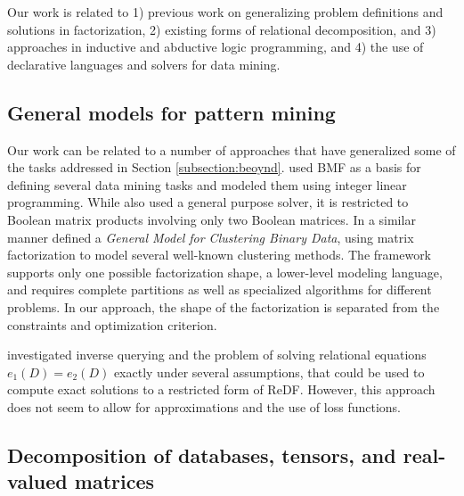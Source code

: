\label{sec:relwork}
Our work is related to 1) previous work on generalizing problem definitions and solutions in factorization, 2) existing forms of relational decomposition, and 3) approaches in inductive and abductive logic programming, and 4) the use of declarative languages and solvers for data mining.



\subsection{General models for pattern mining} 
Our work can be related to a number of approaches that have generalized some of the tasks addressed in Section \ref{subsection:beoynd}.  
\citet{optimalBMFroles} used BMF as a basis for defining several data mining tasks and modeled them using  integer linear programming. 
While \citet{optimalBMFroles} also used a general purpose solver, it is restricted to Boolean matrix products involving only two Boolean matrices. 
In a similar manner \citet{generalClustering} defined a \textit{General Model for Clustering Binary Data}, using matrix factorization to model several well-known clustering methods.  The framework supports only one possible factorization shape, a lower-level modeling language, and requires complete partitions as well as specialized algorithms for different problems. In our approach, the shape of the factorization is separated from the constraints and optimization criterion.



\citet{solvingrelationalequations, journals/is/FanGZ12} investigated inverse querying and the problem of solving relational equations $e_1(D) = e_2(D)$ exactly under several assumptions, that could be used to compute exact solutions to a restricted form of ReDF. However, this approach does not seem to allow for approximations and the use of loss functions. 




\subsection{Decomposition of databases, tensors, and real-valued matrices} 

